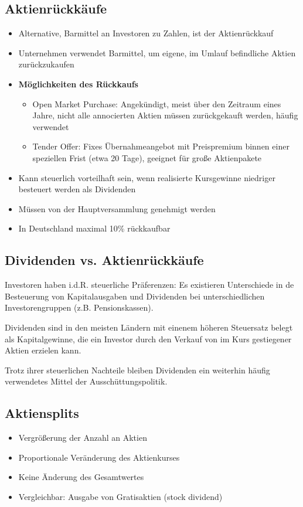 \subsection{Aktienrückkäufe}
\begin{itemize}
	\item Alternative, Barmittel an Investoren zu Zahlen, ist der Aktienrückkauf
	\item Unternehmen verwendet Barmittel, um eigene, im Umlauf befindliche Aktien zurückzukaufen
	\item \textbf{Möglichkeiten des Rückkaufs}
	\begin{itemize}
		\item Open Market Purchase: Angekündigt, meist über den Zeitraum eines Jahre, nicht alle annocierten Aktien müssen zurückgekauft werden, häufig verwendet
		\item Tender Offer: Fixes Übernahmeangebot mit Preispremium binnen einer speziellen Frist (etwa 20 Tage), geeignet für große Aktienpakete
	\end{itemize}
	\item Kann steuerlich vorteilhaft sein, wenn realisierte Kursgewinne niedriger besteuert werden als Dividenden
	\item Müssen von der Hauptversammlung genehmigt werden
	\item In Deutschland maximal 10\% rückkaufbar
\end{itemize}


\subsection{Dividenden vs. Aktienrückkäufe}
Investoren haben i.d.R. steuerliche Präferenzen: Es existieren Unterschiede in de Besteuerung von Kapitalausgaben und Dividenden bei unterschiedlichen Investorengruppen (z.B. Pensionskassen).

Dividenden sind in den meisten Ländern mit einenem höheren Steuersatz belegt als Kapitalgewinne, die ein Investor durch den Verkauf von im Kurs gestiegener Aktien erzielen kann.

Trotz ihrer steuerlichen Nachteile bleiben Dividenden ein weiterhin häufig verwendetes Mittel der Ausschüttungspolitik.


\subsection{Aktiensplits}
\begin{itemize}
	\item Vergrößerung der Anzahl an Aktien
	\item Proportionale Veränderung des Aktienkurses
	\item Keine Änderung des Gesamtwertes
	\item Vergleichbar: Ausgabe von Gratisaktien (stock dividend)
\end{itemize}



